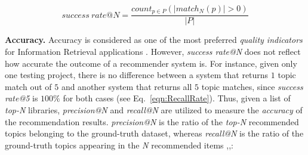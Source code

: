 \begin{equation} \label{eqn:RecallRate}
success\ rate@N=\frac{ count_{p \in P}( \left | match_{N}(p) \right | > 0 ) }{\left | P \right |} %
\end{equation}

\vspace{.1cm}
\vspace{.1cm}




%
%

\noindent \textbf{Accuracy.} Accuracy is considered as one of the most preferred \emph{quality indicators} for Information Retrieval applications \cite{Saracevic:1995:EEI:215206.215351}. However, \emph{success rate@N} does not reflect how accurate the outcome of a recommender system is. For instance, given only one testing project, there is no difference between a system that returns $1$ topic match out of $5$ and another system that returns all $5$ topic matches, since \emph{success rate@5} is $100\%$ for both cases (see Eq.~\eqref{eqn:RecallRate}). Thus, given a list of \emph{top-N} libraries, \emph{precision@N} and \emph{recall@N} are utilized to measure the \emph{accuracy} of the recommendation results. \emph{precision@N} is the ratio of the \emph{top-N} recommended topics belonging to the ground-truth dataset, whereas \emph{recall@N} is the ratio of the ground-truth topics appearing in the \emph{N} recommended items \cite{Nguyen:2019:FRS:3339505.3339636},\cite{DiNoia:2012:LOD:2362499.2362501},\cite{Davis:2006:RPR:1143844.1143874}: %

